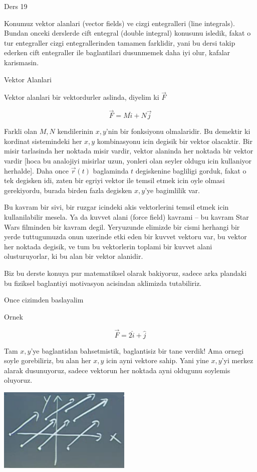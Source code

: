 \documentclass[12pt,fleqn]{article}
\begin{document}
Ders 19

Konumuz vektor alanlari (vector fields) ve cizgi entegralleri (line
integrals). Bundan onceki derslerde cift entegral (double integral)
konusunu isledik, fakat o tur entegraller cizgi entegrallerinden tamamen
farklidir, yani bu dersi takip ederken cift entegraller ile baglantilari
dusunmemek daha iyi olur, kafalar karismasin. 

Vektor Alanlari

Vektor alanlari bir vektordurler aslinda, diyelim ki $\vec{F}$

\[ \vec{F} = M\hat{i} + N\vec{j} \]

Farkli olan $M,N$ kendilerinin $x,y$'nin bir fonksiyonu olmalaridir. Bu
demektir ki kordinat sistemindeki her $x,y$ kombinasyonu icin degisik bir
vektor olacaktir. Bir misir tarlasinda her noktada misir vardir, vektor
alaninda her noktada bir vektor vardir [hoca bu analojiyi misirlar uzun,
yonleri olan seyler oldugu icin kullaniyor herhalde]. Daha once
$\vec{r}(t)$ baglaminda $t$ degiskenine bagliligi gorduk, fakat o tek
degisken idi, zaten bir egriyi vektor ile temsil etmek icin oyle olmasi
gerekiyordu, burada birden fazla degisken $x,y$'ye bagimlilik var. 

Bu kavram bir sivi, bir ruzgar icindeki akis vektorlerini temsil etmek icin
kullanilabilir mesela. Ya da kuvvet alani (force field) kavrami -- bu
kavram Star Wars filminden bir kavram degil. Yeryuzunde elimizde bir cismi
herhangi bir yerde tuttugumuzda onun uzerinde etki eden bir kuvvet vektoru
var, bu vektor her noktada degisik, ve tum bu vektorlerin toplami bir
kuvvet alani olusturuyorlar, ki bu alan bir vektor alanidir. 

Biz bu derste konuya pur matematiksel olarak bakiyoruz, sadece arka
plandaki bu fiziksel baglantiyi motivasyon acisindan aklimizda
tutabiliriz. 

Once cizimden baslayalim

Ornek

\[ \vec{F} = 2\hat{i} + \hat{j} \]

Tam $x,y$'ye baglantidan bahsetmistik, baglantisiz bir tane verdik! Ama
ornegi soyle gorebiliriz, bu alan her $x,y$ icin ayni vektore sahip. Yani
yine $x,y$'yi merkez alarak dusunuyoruz, sadece vektorun her noktada ayni
oldugunu soylemis oluyoruz.

\includegraphics[height=4cm]{19_1.png}
\end{document}
